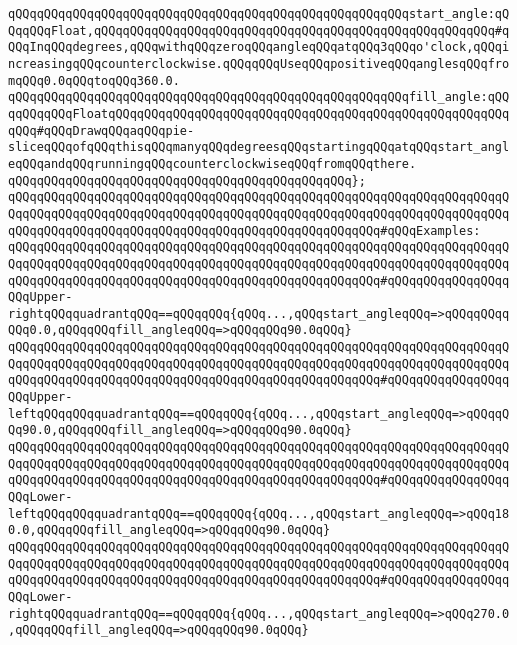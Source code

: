 \newline
\verb|qQQqqQQqqQQqqQQqqQQqqQQqqQQqqQQqqQQqqQQqqQQqqQQqqQQqqQQqstart_angle:qQQqqQQqFloat,qQQqqQQqqQQqqQQqqQQqqQQqqQQqqQQqqQQqqQQqqQQqqQQqqQQqqQQq#qQQqInqQQqdegrees,qQQqwithqQQqzeroqQQqangleqQQqatqQQq3qQQqo'clock,qQQqincreasingqQQqcounterclockwise.qQQqqQQqUseqQQqpositiveqQQqanglesqQQqfromqQQq0.0qQQqtoqQQq360.0.|\newline
\verb|qQQqqQQqqQQqqQQqqQQqqQQqqQQqqQQqqQQqqQQqqQQqqQQqqQQqqQQqfill_angle:qQQqqQQqqQQqFloatqQQqqQQqqQQqqQQqqQQqqQQqqQQqqQQqqQQqqQQqqQQqqQQqqQQqqQQqqQQq#qQQqDrawqQQqaqQQqpie-sliceqQQqofqQQqthisqQQqmanyqQQqdegreesqQQqstartingqQQqatqQQqstart_angleqQQqandqQQqrunningqQQqcounterclockwiseqQQqfromqQQqthere.|\newline
\verb|qQQqqQQqqQQqqQQqqQQqqQQqqQQqqQQqqQQqqQQqqQQqqQQq};|\newline
\verb|qQQqqQQqqQQqqQQqqQQqqQQqqQQqqQQqqQQqqQQqqQQqqQQqqQQqqQQqqQQqqQQqqQQqqQQqqQQqqQQqqQQqqQQqqQQqqQQqqQQqqQQqqQQqqQQqqQQqqQQqqQQqqQQqqQQqqQQqqQQqqQQqqQQqqQQqqQQqqQQqqQQqqQQqqQQqqQQqqQQqqQQqqQQqqQQq#qQQqExamples:|\newline
\verb|qQQqqQQqqQQqqQQqqQQqqQQqqQQqqQQqqQQqqQQqqQQqqQQqqQQqqQQqqQQqqQQqqQQqqQQqqQQqqQQqqQQqqQQqqQQqqQQqqQQqqQQqqQQqqQQqqQQqqQQqqQQqqQQqqQQqqQQqqQQqqQQqqQQqqQQqqQQqqQQqqQQqqQQqqQQqqQQqqQQqqQQqqQQqqQQq#qQQqqQQqqQQqqQQqqQQqUpper-rightqQQqquadrantqQQq==qQQqqQQq{qQQq...,qQQqstart_angleqQQq=>qQQqqQQqqQQq0.0,qQQqqQQqfill_angleqQQq=>qQQqqQQq90.0qQQq}|\newline
\verb|qQQqqQQqqQQqqQQqqQQqqQQqqQQqqQQqqQQqqQQqqQQqqQQqqQQqqQQqqQQqqQQqqQQqqQQqqQQqqQQqqQQqqQQqqQQqqQQqqQQqqQQqqQQqqQQqqQQqqQQqqQQqqQQqqQQqqQQqqQQqqQQqqQQqqQQqqQQqqQQqqQQqqQQqqQQqqQQqqQQqqQQqqQQqqQQq#qQQqqQQqqQQqqQQqqQQqUpper-leftqQQqqQQqquadrantqQQq==qQQqqQQq{qQQq...,qQQqstart_angleqQQq=>qQQqqQQq90.0,qQQqqQQqfill_angleqQQq=>qQQqqQQq90.0qQQq}|\newline
\verb|qQQqqQQqqQQqqQQqqQQqqQQqqQQqqQQqqQQqqQQqqQQqqQQqqQQqqQQqqQQqqQQqqQQqqQQqqQQqqQQqqQQqqQQqqQQqqQQqqQQqqQQqqQQqqQQqqQQqqQQqqQQqqQQqqQQqqQQqqQQqqQQqqQQqqQQqqQQqqQQqqQQqqQQqqQQqqQQqqQQqqQQqqQQqqQQq#qQQqqQQqqQQqqQQqqQQqLower-leftqQQqqQQqquadrantqQQq==qQQqqQQq{qQQq...,qQQqstart_angleqQQq=>qQQq180.0,qQQqqQQqfill_angleqQQq=>qQQqqQQq90.0qQQq}|\newline
\verb|qQQqqQQqqQQqqQQqqQQqqQQqqQQqqQQqqQQqqQQqqQQqqQQqqQQqqQQqqQQqqQQqqQQqqQQqqQQqqQQqqQQqqQQqqQQqqQQqqQQqqQQqqQQqqQQqqQQqqQQqqQQqqQQqqQQqqQQqqQQqqQQqqQQqqQQqqQQqqQQqqQQqqQQqqQQqqQQqqQQqqQQqqQQqqQQq#qQQqqQQqqQQqqQQqqQQqLower-rightqQQqquadrantqQQq==qQQqqQQq{qQQq...,qQQqstart_angleqQQq=>qQQq270.0,qQQqqQQqfill_angleqQQq=>qQQqqQQq90.0qQQq}|\newline

